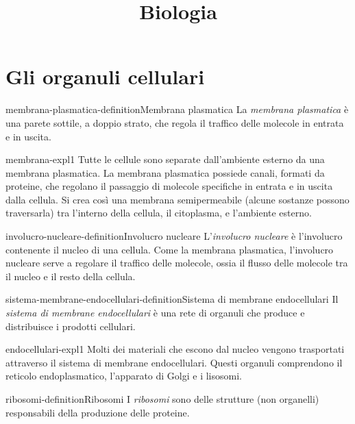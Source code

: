 \documentclass[preview]{standalone}
\begin{document}
\title{Biologia}
\genpage

\section{Gli organuli cellulari}

\begin{snippetdefinition}{membrana-plasmatica-definition}{Membrana plasmatica}
    La \textit{membrana plasmatica} è una parete sottile, a doppio strato,
    che regola il traffico delle molecole in entrata e in uscita.
\end{snippetdefinition}

\begin{snippet}{membrana-expl1}
    Tutte le cellule sono separate dall'ambiente esterno da
    una membrana plasmatica.
    La membrana plasmatica possiede canali, formati da proteine, che regolano il passaggio di molecole
    specifiche in entrata e in uscita dalla cellula.
    Si crea così una membrana semipermeabile (alcune sostanze possono traversarla) tra l'interno
    della cellula, il citoplasma, e l'ambiente esterno.
\end{snippet}

\begin{snippetdefinition}{involucro-nucleare-definition}{Involucro nucleare}
    L'\textit{involucro nucleare} è l'involucro contenente il nucleo
    di una cellula. Come la membrana plasmatica, l'involucro nucleare serve a
    regolare il traffico delle molecole, ossia il flusso delle molecole tra il nucleo
    e il resto della cellula.
\end{snippetdefinition}

\begin{snippetdefinition}{sistema-membrane-endocellulari-definition}{Sistema di membrane endocellulari}
    Il \textit{sistema di membrane endocellulari} è una rete di organuli che
    produce e distribuisce i prodotti cellulari.
\end{snippetdefinition}

\begin{snippet}{endocellulari-expl1}
    Molti dei materiali che escono dal nucleo vengono trasportati attraverso il sistema di
    membrane endocellulari.
    Questi organuli comprendono il reticolo endoplasmatico, l'apparato di Golgi e i lisosomi.
\end{snippet}

\begin{snippetdefinition}{ribosomi-definition}{Ribosomi}
    I \textit{ribosomi} sono delle strutture (non organelli) responsabili della produzione delle proteine.
\end{snippetdefinition}
\end{document}
